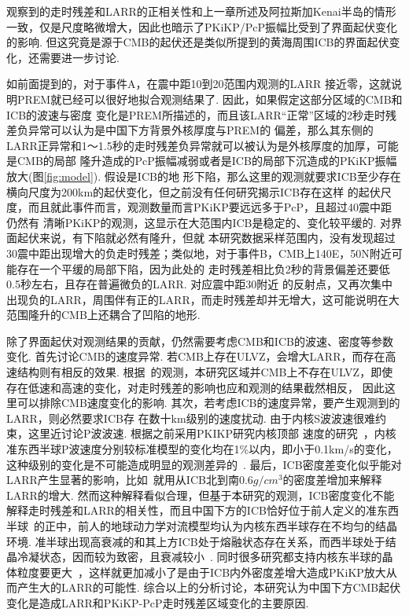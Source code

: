 观察到的走时残差和LARR的正相关性和上一章所述及阿拉斯加Kenai半岛的情形一致，仅是尺度略微增大，因此也暗示了PKiKP/PcP振幅比受到了界面起伏变化的影响. 但这究竟是源于CMB的起伏还是类似\citet{Shen2016a}所提到的黄海周围ICB的界面起伏变化，还需要进一步讨论.

如前面提到的，对于事件A，在震中距10{\textdegree}到20{\textdegree}范围内观测的LARR
接近零，这就说明PREM就已经可以很好地拟合观测结果了. 因此，如果假定这部分区域的CMB和ICB的波速与密度
变化是PREM所描述的，而且该LARR“正常”区域的2秒走时残差负异常可以认为是中国下方背景外核厚度与PREM的
偏差，那么其东侧的LARR正异常和1～1.5秒的走时残差负异常就可以被认为是外核厚度的加厚，可能是CMB的局部
隆升造成的PcP振幅减弱或者是ICB的局部下沉造成的PKiKP振幅放大(图\ref{fig:model}). 假设是ICB的地
形下陷，那么这里的观测就要求ICB至少存在横向尺度为200km的起伏变化，但之前没有任何研究揭示ICB存在这样
的起伏尺度，而且就此事件而言，观测数量而言PKiKP要远远多于PcP，且超过40{\textdegree}震中距仍然有
清晰PKiKP的观测，这显示在大范围内ICB是稳定的、变化较平缓的. 对界面起伏来说，有下陷就必然有隆升，但就
本研究数据采样范围内，没有发现超过30{\textdegree}震中距出现增大的负走时残差；类似地，对于事件B，CMB上140{\textdegree}E，50{\textdegree}N附近可能存在一个平缓的局部下陷，因为此处的
走时残差相比负2秒的背景偏差还要低0.5秒左右，且存在普遍微负的LARR. 对应震中距30{\textdegree}附近
的反射点，又再次集中出现负的LARR，周围伴有正的LARR，而走时残差却并无增大，这可能说明在大范围隆升的CMB上还耦合了凹陷的地形.

除了界面起伏对观测结果的贡献，仍然需要考虑CMB和ICB的波速、密度等参数变化. 首先讨论CMB的速度异常. 若CMB上存在ULVZ，会增大LARR，而存在高速结构则有相反的效果. 根据~\citet{Thorne2004a,Xu2009a}的观测，本研究区域并CMB上不存在ULVZ，即使存在低速和高速的变化，对走时残差的影响也应和观测的结果截然相反，
因此这里可以排除CMB速度变化的影响. 其次，若考虑ICB的速度异常，要产生观测到的LARR，则必然要求ICB存
在数十km级别的速度扰动. 由于内核S波波速很难约束，这里近讨论P波波速. 根据之前采用PKIKP研究内核顶部
速度的研究~\citep{Tanak2012,Iritani2014}，内核准东西半球P波速度分别较标准模型的变化均在1\%以内，即小于0.1km/s的变化，这种级别的变化是不可能造成明显的观测差异的~\citep{Koper2004a}. 最后，ICB密度差变化似乎能对LARR产生显著的影响，比如~\citet{Shen2016a}就用从ICB北到南0.6$g/cm^3$的密度差增加来解释LARR的增大. 然而这种解释看似合理，但基于本研究的观测，ICB密度变化不能解释走时残差和LARR的相关性，而且中国下方的ICB恰好位于前人定义的准东西半球~\citep{Tanaka1997}的正中，前人的地球动力学对流模型均认为内核东西半球存在不均匀的结晶环境. 准半球出现高衰减的和其上方ICB处于熔融状态存在关系，而西半球处于结晶冷凝状态，因而较为致密，且衰减较小~\citep{Tkalcic2015}. 同时很多研究都支持内核东半球的晶体粒度要更大~\citep{Niu2002,Iritani2014a}，这样就更加减小了是由于ICB内外密度差增大造成PKiKP放大从而产生大的LARR的可能性. 综合以上的分析讨论，本研究认为中国下方CMB起伏变化是造成LARR和PKiKP-PcP走时残差区域变化的主要原因.

